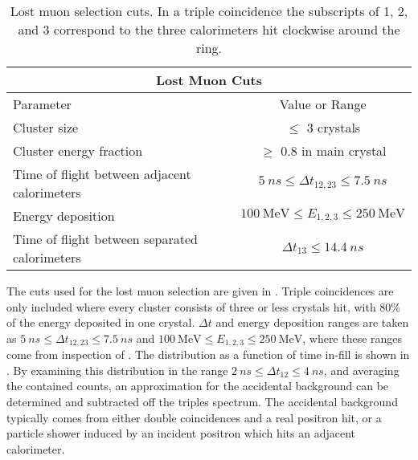 \begin{table}
\centering
\setlength\tabcolsep{10pt}
\renewcommand{\arraystretch}{1.2}
\begin{tabular*}{1\linewidth}{@{\extracolsep{\fill}}lc}
  \hline
    \multicolumn{2}{c}{\textbf{Lost Muon Cuts}} \\
  \hline\hline
    Parameter & Value or Range \\
  \hline
    Cluster size & $\leq$ 3 crystals \\
    Cluster energy fraction & $\geq$ 0.8 in main crystal \\
    Time of flight between adjacent calorimeters & $\SI{5}{ns} \leq \Delta t_{12, 23} \leq \SI{7.5}{ns}$ \\
    Energy deposition & $\SI{100}{\MeV} \leq E_{1,2,3} \leq \SI{250}{\MeV}$ \\
    Time of flight between separated calorimeters & $\Delta t_{13} \leq \SI{14.4}{ns}$ \\
  \hline 
\end{tabular*}
\caption[Lost muon cuts]{Lost muon selection cuts. In a triple coincidence the subscripts of 1, 2, and 3 correspond to the three calorimeters hit clockwise around the ring.}
\label{tab:lostmuoncuts}
\end{table}



The cuts used for the lost muon selection are given in . Triple coincidences are only included where every cluster consists of three or less crystals hit, with 80\% of the energy deposited in one crystal. $\Delta t$ and energy deposition ranges are taken as $\SI{5}{ns} \leq \Delta t_{12, 23} \leq \SI{7.5}{ns}$ and $\SI{100}{\MeV} \leq E_{1,2,3} \leq \SI{250}{\MeV}$, where these ranges come from inspection of . The \DT distribution as a function of time in-fill is shown in . By examining this distribution in the range $\SI{2}{ns} \leq \Delta t_{12} \leq \SI{4}{ns}$, and averaging the contained counts, an approximation for the accidental background can be determined and subtracted off the triples spectrum. The accidental background typically comes from either double coincidences and a real positron hit, or a particle shower induced by an incident positron which hits an adjacent calorimeter. 


